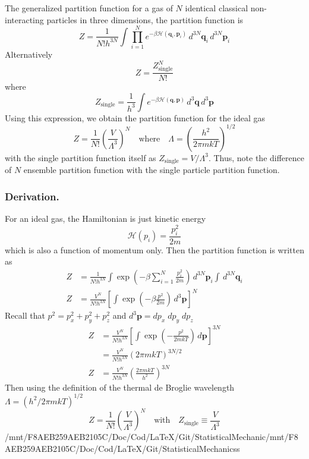 \documentclass[../../../Main.tex]{subfiles}
\begin{document}
The generalized partition function for a gas of $N$ identical classical non-interacting particles in three dimensions, the partition function is
\begin{equation*}
	Z=\frac{1}{N!h^{3N}} \int \prod_{i=1}^{N} e^{-\beta \mathcal{H}(\mathbf{q}_i, \mathbf{p}_i)} \, d^{3N} \mathbf{q}_i \, d^{3N} \mathbf{p}_i
\end{equation*}
Alternatively
\begin{equation*}
	Z= \frac{Z^N_\text{single}}{N!}
\end{equation*}
where
\begin{equation*}
	Z_\text{single}= \frac{1}{h^{3}} \int e^{-\beta \mathcal{H}(\mathbf{q}, \mathbf{p})} \, d^{3} \mathbf{q} \, d^{3} \mathbf{p}
\end{equation*}
Using this expression, we obtain the partition function for the ideal gas
\begin{equation*}
	Z=\frac{1}{N!}\left(\frac{V}{\Lambda^3}\right)^N\quad\text{where}\quad \Lambda=\left(\frac{h^2}{2\pi mkT}\right)^{1/2}
\end{equation*}
with the single partition function itself as $Z_\text{single}=V/\Lambda^3$.
Thus, note the difference of $N$ ensemble partition function with the single particle partition function.

\subsubsection*{Derivation.} For an ideal gas, the Hamiltonian is just kinetic energy
\begin{equation*}
	\mathcal{H}(p_i)=\frac{p_i^2}{2m}
\end{equation*}
which is also a function of momentum only.
Then the partition function is written as
\begin{align*}
	Z & =\frac{1}{N!h^{3N}} \int \exp\left(-\beta\sum_{i=1}^{N}\frac{p_i^2}{2m}\right) \, d^{3N} \mathbf{p}_i \int\, d^{3N} \mathbf{q}_i \\
	Z & =\frac{V^N}{N!h^{3N}}\left[ \int \exp\left(-\beta\frac{p^2}{2m}\right) \, d^{3} \mathbf{p} \right]^N
\end{align*}
Recall that $p^2=p_x^2 +p_y^2 +p_z^2$ and $d^{3} \mathbf{p}=dp_x\;dp_y\;dp_z$
\begin{align*}
	Z & =\frac{V^N}{N!h^{3N}}\left[ \int \exp\left(-\frac{p^2}{2mkT}\right) \, d\mathbf{p} \right]^{3N} \\
	  & =\frac{V^N}{N!h^{3N}}(2\pi mkT )^{3N/2}                                                         \\
	Z & =\frac{V^N}{N!h^{3N}}\left(\frac{2\pi mkT}{h^2}\right)^{3N}
\end{align*}
Then using the definition of the thermal de Broglie wavelength $\Lambda= (h^2/2\pi mkT)^{1/2}$
\begin{equation*}
	Z=\frac{1}{N!}\left(\frac{V}{\Lambda^3}\right)^N\quad\text{with} \quad Z_\text{single}\equiv\frac{V}{\Lambda^3}
\end{equation*}
/mnt/F8AEB259AEB2105C/Doc/Cod/LaTeX/Git/StatisticalMechanic/mnt/F8AEB259AEB2105C/Doc/Cod/LaTeX/Git/StatisticalMechanicss
\end{document}
